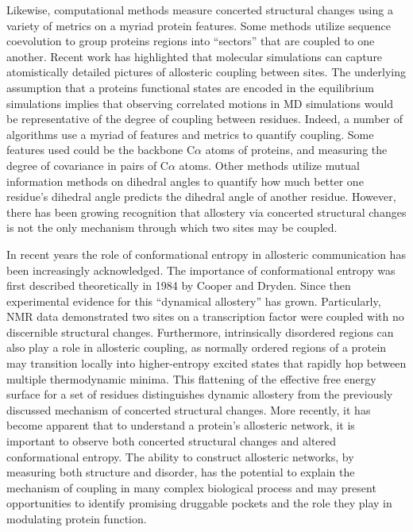 \documentclass[../main.tex]{subfiles}
\begin{document}
		Likewise, computational methods measure concerted structural changes using a variety of metrics on a myriad protein features. Some methods utilize sequence coevolution to group proteins regions into “sectors” that are coupled to one another\cite{Lockless:1999uf}. Recent work has highlighted that molecular simulations can capture atomistically detailed pictures of allosteric coupling between sites. The underlying assumption that a proteins functional states are encoded in the equilibrium simulations implies that observing correlated motions in MD simulations would be representative of the degree of coupling between residues. Indeed, a number of algorithms use a myriad of features and metrics to quantify coupling\cite{Feher:2014cx,Greener:2017ie}. Some features used could be the backbone C$\alpha$ atoms of proteins, and measuring the degree of covariance in pairs of C$\alpha$ atoms\cite{Ichiye:1991db}. Other methods utilize mutual information methods on dihedral angles to quantify how much better one residue’s dihedral angle predicts the dihedral angle of another residue\cite{McClendon:2009gd}. However, there has been growing recognition that allostery via concerted structural changes is not the only mechanism through which two sites may be coupled. 

		In recent years the role of conformational entropy in allosteric communication has been increasingly acknowledged. The importance of conformational entropy was first described theoretically in 1984 by Cooper and Dryden\cite{Cooper:1984tb}. Since then experimental evidence for this “dynamical allostery” has grown. Particularly, NMR data demonstrated two sites on a transcription factor were coupled with no discernible structural changes\cite{Popovych:2006js}. Furthermore, intrinsically disordered regions can also play a role in allosteric coupling, as normally ordered regions of a protein may transition locally into higher-entropy excited states that rapidly hop between multiple thermodynamic minima. This flattening of the effective free energy surface for a set of residues distinguishes dynamic allostery from the previously discussed mechanism of concerted structural changes. More recently, it has become apparent that to understand a protein's allosteric network, it is important to observe both concerted structural changes and altered conformational entropy\cite{Lin:2016gi}. The ability to construct allosteric networks, by measuring both structure and disorder, has the potential to explain the mechanism of coupling in many complex biological process and may present opportunities to identify promising druggable pockets and the role they play in modulating protein function. 
\end{document}
